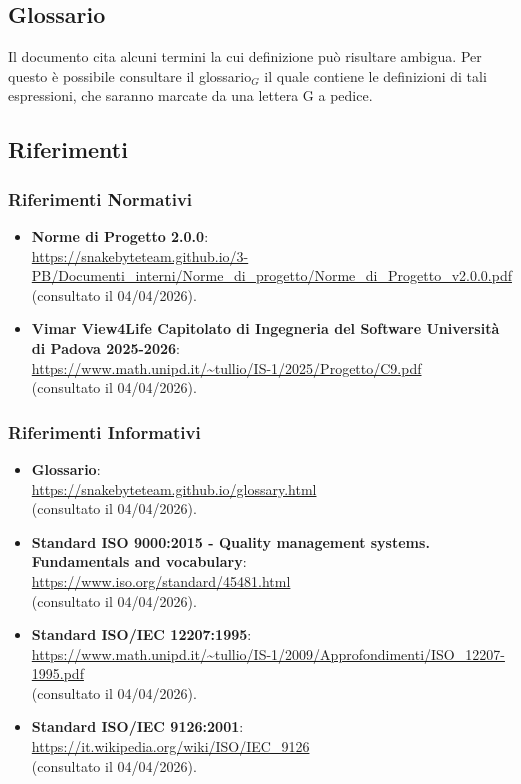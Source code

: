 \documentclass[10pt, letterpaper]{article}
\begin{document}
\subsection{Glossario}
Il documento cita alcuni termini la cui definizione può risultare ambigua. Per questo è possibile consultare
il glossario${_G}$ il quale contiene le definizioni di tali espressioni, che saranno marcate da una lettera G a
pedice.
\subsection{Riferimenti}
\subsubsection{Riferimenti Normativi}
\begin{itemize}
    \item \textbf{Norme di Progetto 2.0.0}:
          \\ \url{https://snakebyteteam.github.io/3-PB/Documenti_interni/Norme_di_progetto/Norme_di_Progetto_v2.0.0.pdf}
          \\ (consultato il 04/04/2026).
    \item \textbf{Vimar View4Life Capitolato di Ingegneria del Software Università di Padova 2025-2026}:
          \\ \url{https://www.math.unipd.it/~tullio/IS-1/2025/Progetto/C9.pdf}
          \\ (consultato il 04/04/2026).
\end{itemize}
\subsubsection{Riferimenti Informativi}
\begin{itemize}
    \item \textbf{Glossario}:
          \\ \url{https://snakebyteteam.github.io/glossary.html}
          \\ (consultato il 04/04/2026).
    \item \textbf{Standard ISO 9000:2015 - Quality management systems. Fundamentals and vocabulary}:
          \\ \url{https://www.iso.org/standard/45481.html}
          \\ (consultato il 04/04/2026).
    \item \textbf{Standard ISO/IEC 12207:1995}:
          \\ \url{https://www.math.unipd.it/~tullio/IS-1/2009/Approfondimenti/ISO_12207-1995.pdf}
          \\ (consultato il 04/04/2026).
    \item \textbf{Standard ISO/IEC 9126:2001}:
          \\ \url{https://it.wikipedia.org/wiki/ISO/IEC_9126}
          \\ (consultato il 04/04/2026).
\end{itemize}
\end{document}
